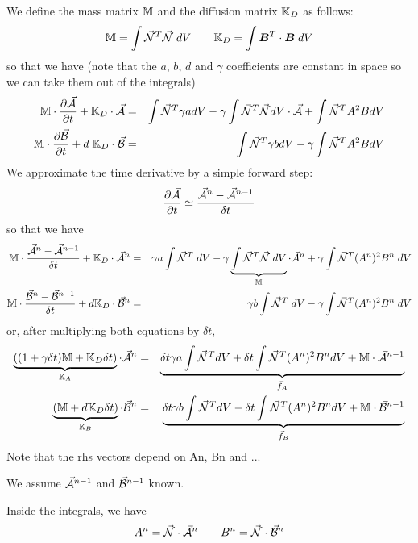 We define the mass matrix ${\mathbb{M}}$ and the diffusion matrix ${\mathbb{K}}_D$ as follows:
\[
{{\mathbb{M}}} = 
\int \vec{{\mathcal{N}}}^T \vec{{\mathcal{N}}} \; dV 
\qquad
{\mathbb{K}}_D = 
\int {\bm B}^T \cdot {\bm B} \; dV  
\]
so that we have (note that  the $a$, $b$, $d$ and $\gamma$ coefficients are
constant in space so we can take them out of the integrals)
\begin{eqnarray}
{{\mathbb{M}}} \cdot  \frac{\partial \vec{\cal A}}{\partial t} + 
{\mathbb{K}}_D \cdot \vec{\cal A} 
&=& \int \vec{{\mathcal{N}}}^T \gamma a dV 
- \gamma \int \vec{{\mathcal{N}}}^T \vec{{\mathcal{N}}} dV \cdot \vec{\cal A}
+ \int \vec{{\mathcal{N}}}^T A^2 B dV  \nonumber\\
{{\mathbb{M}}} \cdot  \frac{\partial \vec{\cal B}}{\partial t} + 
d\; {\mathbb{K}}_D \cdot \vec{\cal B} 
&=& \int \vec{{\mathcal{N}}}^T \gamma b dV 
- \gamma \int \vec{{\mathcal{N}}}^T A^2 B dV 
\end{eqnarray}
We approximate the time derivative by a simple forward step:
\[
\frac{\partial \vec{\cal A}}{\partial t}  \simeq
\frac{ \vec{\cal A}^n - \vec{\cal A}^{n-1}  }{\delta t} 
\]
so that we have
\begin{eqnarray}
{{\mathbb{M}}} \cdot \frac{ \vec{\cal A}^n - \vec{\cal A}^{n-1}  }{\delta t}  +
{\mathbb{K}}_D \cdot \vec{\cal A}^n 
&=& \gamma a\int \vec{{\mathcal{N}}}^T \;  dV 
- \gamma \underbrace{\int \vec{{\mathcal{N}}}^T \vec{{\mathcal{N}}} \; dV}_{{\mathbb{M}}} \cdot \vec{\cal A}^n
+ \gamma \int \vec{{\mathcal{N}}}^T (A^n)^2 B^n \; dV  \nonumber\\
{{\mathbb{M}}} \cdot \frac{ \vec{\cal B}^n - \vec{\cal B}^{n-1}  }{\delta t}  +
d {\mathbb{K}}_D \cdot \vec{\cal B}^n 
&=& \gamma b\int \vec{{\mathcal{N}}}^T \; dV 
- \gamma \int \vec{{\mathcal{N}}}^T (A^n)^2 B^n \; dV 
\end{eqnarray}
or, after multiplying both equations by $\delta t$,
\begin{eqnarray}
\underbrace{
((1+\gamma \delta t) {{\mathbb{M}}} + {\mathbb{K}}_D  \delta t )}_{{\mathbb{K}}_A} \cdot \vec{\cal A}^n 
&=& 
\underbrace{\delta t \gamma a \int \vec{{\mathcal{N}}}^T  dV 
+ \delta t\int \vec{{\mathcal{N}}}^T (A^n)^2 B^n dV  
+ {{\mathbb{M}}} \cdot \vec{\cal A}^{n-1}}_{\vec{f}_A}
\nonumber\\
\underbrace{({\mathbb{M}} + d {\mathbb{K}}_D \delta t)}_{{\mathbb{K}}_B} \cdot \vec{\cal B}^n 
&=& 
\underbrace{
\delta t \gamma b \int \vec{{\mathcal{N}}}^T dV 
- \delta t\int \vec{{\mathcal{N}}}^T (A^n)^2 B^n dV 
+ {{\mathbb{M}}} \cdot \vec{\cal B}^{n-1}}_{\vec{f}_B}
\end{eqnarray}
Note that the rhs vectors depend on An, Bn and ...

We assume $\vec{\cal A}^{n-1}$ and $\vec{\cal B}^{n-1}$ known. 


Inside the integrals, we have
\[
A^n = \vec{\cal N}\cdot \vec{\cal A}^n
\qquad 
B^n = \vec{\cal N}\cdot \vec{\cal B}^n
\]



